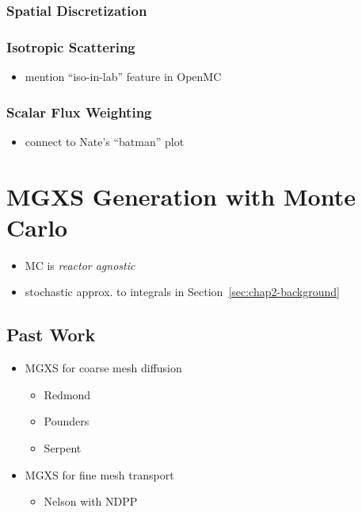 \subsubsection{Spatial Discretization}
\label{subsubsec:chap2-space-discrete}

\subsubsection{Isotropic Scattering}
\label{subsubsec:chap2-iso-scatter}

\begin{itemize}
  \item mention ``iso-in-lab'' feature in OpenMC
\end{itemize}

\subsubsection{Scalar Flux Weighting}
\label{subsubsec:chap2-const-in-angle}

\begin{itemize}
  \item connect to Nate's ``batman'' plot
\end{itemize}


\section{MGXS Generation with Monte Carlo}
\label{sec:chap2-mgxs-mc}

\begin{itemize}
  \item \ac{MC} is \emph{reactor agnostic}
  \item stochastic approx. to integrals in Section~\ref{sec:chap2-background}
\end{itemize}

\subsection{Past Work}
\label{subsec:chap2-past-work}

\begin{itemize}
  \item \ac{MGXS} for coarse mesh diffusion
  \begin{itemize}
    \item Redmond
    \item Pounders
    \item Serpent
  \end{itemize}
  \item \ac{MGXS} for fine mesh transport
  \begin{itemize}
    \item Nelson with NDPP
  \end{itemize}
\end{itemize}

